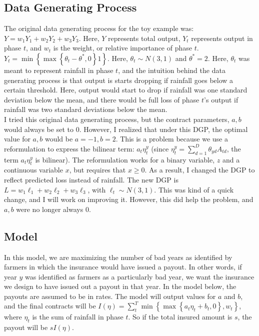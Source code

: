 \documentclass[11pt]{article}
\begin{document}
    \subsection{Data Generating Process}
    The original data generating process for the toy example was: 
    $Y = w_1 Y_1 + w_2 Y_2 + w_3 Y_3$. Here, $Y$ represents total output, $Y_t$ represents output in phase $t$, and $w_t$ is the weight, or relative importance of phase $t$. $Y_t = \min \left \{ \max \left \{ \theta_t- \theta^*, 0 \right \} 1 \right \}$. Here, $\theta_t \sim N(3,1)$ and $\theta^* = 2$. Here, $\theta_t$ was meant to represent rainfall in phase $t$, and the intuition behind the data generating process is that output is starts dropping if rainfall goes below a certain threshold. Here, output would start to drop if rainfall was one standard deviation below the mean, and there would be full loss of phase $t$'s output if rainfall was two standard deviations below the mean. \\
    I tried this original data generating process, but the contract parameters, $a,b$ would always be set to 0. However, I realized that under this DGP, the optimal value for $a,b$ would be $a=-1, b=2$. This is a problem because we use a reformulation to express the bilinear term: $a_t \eta^y_t$ (since $\eta^y_t = \sum_{d=1}^{D} \theta_{yd}A_{td}$, the term $a_t \eta^y_t$ is bilinear). The reformulation works for a binary variable, $z$ and a continuous variable $x$, but requires that $x \geq 0$. As a result, I changed the DGP to reflect predicted loss instead of rainfall. The new DGP is $L = w_1 \ell_1 + w_2 \ell_2 + w_3 \ell_3$, with $\ell_t \sim N(3,1)$. This was kind of a quick change, and I will work on improving it. However, this did help the problem, and $a,b$ were no longer always 0. 
      

  \subsection{Model}
  In this model, we are maximizing the number of bad years as identified by farmers in which the insurance would have issued a payout. In other words, if year $y$ was identified as farmers as a particularly bad year, we want the insurance we design to have issued out a payout in that year. In the model below, the payouts are assumed to be in rates. The model will output values for $a$ and $b$, and the final contracts will be $I(\eta) = \sum_{t}^{T} \min \left \{ \max \left \{ a_t \eta_t + b_t, 0 \right \}, w_t \right \}$, where $\eta_t$ is the sum of rainfall in phase $t$. So if the total insured amount is $s$, the payout will be $sI(\eta)$.
\end{document}
